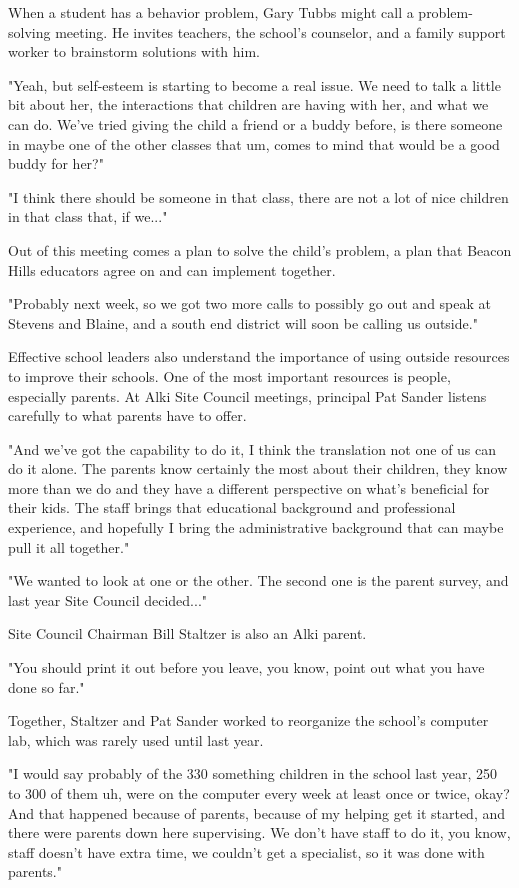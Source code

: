 When a student has a behavior problem, Gary Tubbs might call a problem-solving meeting.
He invites teachers, the school's counselor, and a family support worker to brainstorm solutions with him.

"Yeah, but self-esteem is starting to become a real issue.
We need to talk a little bit about her, the interactions that children are having with her, and what we can do.
We've tried giving the child a friend or a buddy before, is there someone in maybe one of the other classes that um, comes to mind that would be a good buddy for her?"

"I think there should be someone in that class, there are not a lot of nice children in that class that, if we..."

Out of this meeting comes a plan to solve the child's problem, a plan that Beacon Hills educators agree on and can implement together.


"Probably next week, so we got two more calls to possibly go out and speak at Stevens and Blaine, and a south end district will soon be calling us outside."

Effective school leaders also understand the importance of using outside resources to improve their schools.
One of the most important resources is people, especially parents.
At Alki Site Council meetings, principal Pat Sander listens carefully to what parents have to offer.

"And we've got the capability to do it, I think the translation not one of us can do it alone.
The parents know certainly the most about their children, they know more than we do and they have a different perspective on what's beneficial for their kids.
The staff brings that educational background and professional experience, and hopefully I bring the administrative background that can maybe pull it all together."

"We wanted to look at one or the other.
The second one is the parent survey, and last year Site Council decided..."

Site Council Chairman Bill Staltzer is also an Alki parent.


"You should print it out before you leave, you know, point out what you have done so far."

Together, Staltzer and Pat Sander worked to reorganize the school's computer lab, which was rarely used until last year.

"I would say probably of the 330 something children in the school last year, 250 to 300 of them uh, were on the computer every week at least once or twice, okay?
And that happened because of parents, because of my helping get it started, and there were parents down here supervising.
We don't have staff to do it, you know, staff doesn't have extra time, we couldn't get a specialist, so it was done with parents."

